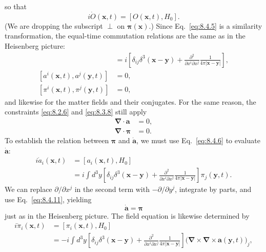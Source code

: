 so that
\begin{equation}
i\dot O(\mathbf x,t)=[O(\mathbf x,t),H_0].
\tag{8.4.6}\label{eq:8.4.6}
\end{equation}
(We are dropping the subscript $\perp$ on $\boldsymbol\pi(\mathbf x)$.) Since
Eq.~\eqref{eq:8.4.5} is a similarity transformation, the equal-time commutation
relations are the same as in the Heisenberg picture:
\begin{align}
[a^i(\mathbf x,t),\pi^j(\mathbf y,t)]
&=i\left[\delta_{ij}\delta^3(\mathbf x-\mathbf y)
 +\frac{\partial^2}{\partial x^i\partial x^j}
  \frac{1}{4\pi\lvert\mathbf x-\mathbf y\rvert}\right],
\tag{8.4.7}\label{eq:8.4.7}\\
[a^i(\mathbf x,t),a^j(\mathbf y,t)]&=0,
\tag{8.4.8}\label{eq:8.4.8}\\
[\pi^i(\mathbf x,t),\pi^j(\mathbf y,t)]&=0,
\tag{8.4.9}\label{eq:8.4.9}
\end{align}
and likewise for the matter fields and their conjugates. For the same reason,
the constraints \eqref{eq:8.2.6} and \eqref{eq:8.3.8} still apply
\begin{align}
\boldsymbol\nabla\cdot\mathbf a&=0,
\tag{8.4.10}\label{eq:8.4.10}\\
\boldsymbol\nabla\cdot\boldsymbol\pi&=0.
\tag{8.4.11}\label{eq:8.4.11}
\end{align}
To establish the relation between $\boldsymbol\pi$ and $\dot{\mathbf a}$, we
must use Eq.~\eqref{eq:8.4.6} to evaluate $\dot{\mathbf a}$:
\begin{align*}
i\dot a_i(\mathbf x,t)
&=[a_i(\mathbf x,t),H_0]\\
&=i\int d^3y\left[
  \delta_{ij}\delta^3(\mathbf x-\mathbf y)
  +\frac{\partial^2}{\partial x^i\partial x^j}
   \frac{1}{4\pi\lvert\mathbf x-\mathbf y\rvert}
  \right]\pi_j(\mathbf y,t).
\end{align*}
We can replace $\partial/\partial x^j$ in the second term with
$-\partial/\partial y^j$, integrate by parts, and use Eq.~\eqref{eq:8.4.11}, yielding
\begin{equation}
\dot{\mathbf a}=\boldsymbol\pi
\tag{8.4.12}\label{eq:8.4.12}
\end{equation}
just as in the Heisenberg picture. The field equation is likewise determined
by
\begin{align*}
i\dot\pi_i(\mathbf x,t)
&=[\pi_i(\mathbf x,t),H_0]\\
&=-i\int d^3y\left[
  \delta_{ij}\delta^3(\mathbf x-\mathbf y)
  +\frac{\partial^2}{\partial x^i\partial x^j}
   \frac{1}{4\pi\lvert\mathbf x-\mathbf y\rvert}
  \right]
  \bigl(\boldsymbol\nabla\times\boldsymbol\nabla\times
        \mathbf a(\mathbf y,t)\bigr)_j,
\end{align*}
